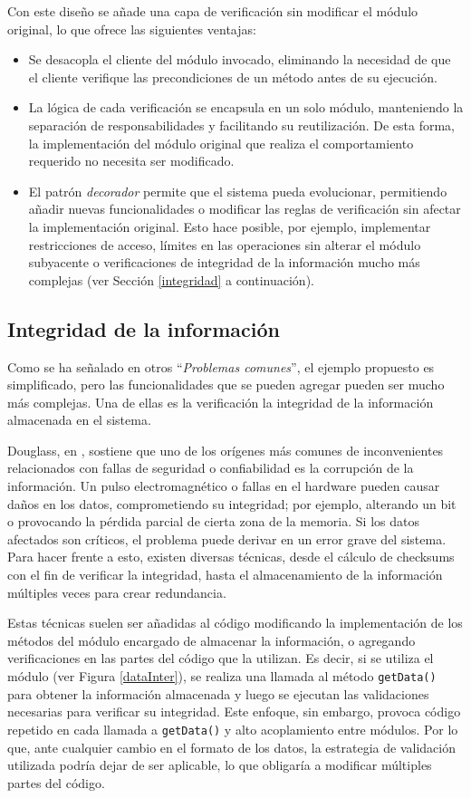 Con este diseño se añade una capa de verificación sin modificar el módulo original, lo que ofrece las siguientes ventajas:
\begin{itemize}
\item Se desacopla el cliente del módulo invocado, eliminando la necesidad de que el cliente verifique las precondiciones de un método antes de su ejecución.
\item La lógica de cada verificación se encapsula en un solo módulo, manteniendo la separación de responsabilidades y facilitando su reutilización. De esta forma, la implementación del módulo original que realiza el comportamiento requerido no necesita ser modificado.
\item El patrón \textit{decorador} permite que el sistema pueda evolucionar, permitiendo añadir nuevas funcionalidades o modificar las reglas de verificación sin afectar la implementación original. Esto hace posible, por ejemplo, implementar restricciones de acceso, límites en las operaciones sin alterar el módulo subyacente o verificaciones de integridad de la información mucho más complejas (ver Sección \ref{integridad} a continuación).
\end{itemize}

\subsection*{Integridad de la información}
\label{integridad}

Como se ha señalado en otros ``\textit{Problemas comunes}'', el ejemplo propuesto es simplificado, pero las funcionalidades que se pueden agregar pueden ser mucho más complejas. Una de ellas es la verificación la integridad de la información almacenada en el sistema.

Douglass, en \cite{douglass}, sostiene que uno de los orígenes más comunes de inconvenientes relacionados con fallas de seguridad o confiabilidad es la corrupción de la información. Un pulso electromagnético o fallas en el hardware pueden causar daños en los datos, comprometiendo su integridad; por ejemplo, alterando un \gls{bit} o provocando la pérdida parcial de cierta zona de la memoria. Si los datos afectados son críticos, el problema puede derivar en un error grave del sistema. Para hacer frente a esto, existen diversas técnicas, desde el cálculo de checksums con el fin de verificar la integridad, hasta el almacenamiento de la información múltiples veces para crear redundancia.

Estas técnicas suelen ser añadidas al código modificando la implementación de los métodos del módulo encargado de almacenar la información, o agregando verificaciones en las partes del código que la utilizan. Es decir, si se utiliza el módulo \Data (ver Figura \ref{dataInter}), se realiza una llamada al método \verb|getData()| para obtener la información almacenada y luego se ejecutan las validaciones necesarias para verificar su integridad. Este enfoque, sin embargo, provoca código repetido en cada llamada a \verb|getData()| y alto acoplamiento entre módulos. Por lo que, ante cualquier cambio en el formato de los datos, la estrategia de validación utilizada podría dejar de ser aplicable, lo que obligaría a modificar múltiples partes del código.

